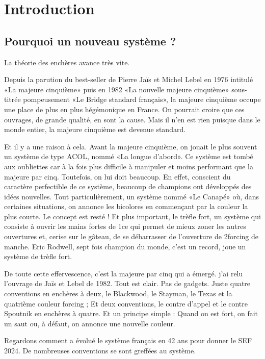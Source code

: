 \chapter*{Introduction}

\section{Pourquoi un nouveau système ?}

La théorie des enchères avance très vite.

Depuis la parution du best-seller de Pierre Jaïs et Michel Lebel en 1976 intitulé «La majeure cinquième» puis en 1982 «La nouvelle majeure cinquième» sous-titrée pompeusement «Le Bridge standard français», la majeure cinquième occupe une place de plus en plus hégémonique en France. On pourrait croire que ces ouvrages, de grande qualité, en sont la cause. Mais il n'en est rien puisque dans le monde entier, la majeure cinquième est devenue standard.

Et il y a une raison à cela. Avant la majeure cinquième, on jouait le plus souvent un système de type ACOL, nommé «La longue d'abord». Ce système est tombé aux oubliettes car à la fois plus difficile à manipuler et moins performant que la majeure par cinq. Toutefois, on lui doit beaucoup. En effet, conscient du caractère perfectible de ce système, beaucoup de champions ont développés des idées nouvelles. Tout particulièrement, un système nommé «Le Canapé» où, dans certaines situations, on annonce les bicolores en commençant par la couleur la plus courte. Le concept est resté ! Et plus important, le trèfle fort, un système qui consiste à ouvrir les mains fortes de 1\T ce qui permet de mieux zoner les autres ouvertures et, cerise sur le gâteau, de se débarrasser de l'ouverture de 2\T forcing de manche. Eric Rodwell, sept fois champion du monde, c'est un record, joue un système de trèfle fort.

De toute cette effervescence, c'est la majeure par cinq qui a émergé. j'ai relu l'ouvrage de Jaïs et Lebel de 1982. Tout est clair. Pas de gadgets. Juste quatre conventions en enchères à deux, le Blackwood, le Stayman, le Texas et la quatrième couleur forcing ; Et deux conventions, le contre d'appel et le contre Spoutnik en enchères à quatre. Et un principe simple : Quand on est fort, on fait un saut ou, à défaut, on annonce une nouvelle couleur.

Regardons comment a évolué le système français en 42 ans pour donner le SEF 2024. De nombreuses conventions se sont greffées au système.

